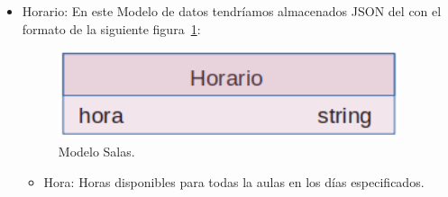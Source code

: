 \documentclass[a4paper, 12pt]{book}
\begin{document}
\begin{itemize}
	\item Horario: En este Modelo de datos tendríamos almacenados JSON del con el formato de la siguiente figura~\ref{fig:mongoDBHorario}:
	\begin{figure}
  	\centering
  	\includegraphics[width=10cm, keepaspectratio]{img/mongoDBHorario.png}
  	\caption{Modelo Salas.}\label{fig:mongoDBHorario}
	\end{figure}
	\begin{itemize}
		\item Hora: Horas disponibles para todas la aulas en los días especificados.
	\end{itemize}
\end{itemize}
\end{document}
